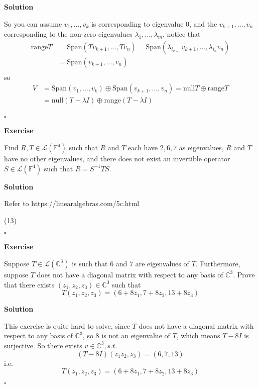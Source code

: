\documentclass{article}
\newenvironment{exercise}{%
{\textbf{Exercise\\}
    }
}{
}
\newenvironment{solution}{%
{
    \textbf{Solution\\}
    }
}{
  \hfill $\square$ 
  \par\bigskip 
}
\newcommand{\CC}{\mathbb{C}}
\newcommand{\FF}{\mathbb{F}}
\newcommand{\spans}{\text{Span}}
\newcommand{\range}{\text{range}}
\newcommand{\n}{\text{null}}
\begin{document}
\begin{CJK}{UTF8}{gkai}
\begin{solution}
    So you can assume $v_1,\ldots,v_k$ is corresponding to eigenvalue $0$, and the $v_{k+1},\ldots,v_n$ corresponding to the non-zero eigenvalues $\lambda_1,\ldots,\lambda_m$, notice that
    \[
    \begin{aligned}
        \range T &= \spans(Tv_{k+1},\ldots,Tv_n) =\spans( \lambda_{i_{k + 1}} v_{k+1},\ldots,\lambda_{i_{n}} v_n )\\
        &= \spans(v_{k+1},\ldots,v_n)\\
    \end{aligned}    
    \]
    so
    \[
    \begin{aligned}
    V &= \spans(v_1,\ldots,v_k) \oplus \spans(v_{k + 1},\ldots,v_n) = \n T \oplus \range T\\
    &= \n(T - \lambda I) \oplus \range (T - \lambda I)  \\
    \end{aligned}  
    \]
\end{solution}

\begin{exercise}
    Find $R ,T \in \mathcal{L}(\FF^4)$ such that $R$ and $T$ each have $2, 6, 7$ as eigenvalues, $R$ and $T$ have no other eigenvalues, and there does not exist an invertible operator $S \in\mathcal{L}(\FF^4)$ such that $R = S^{-1}TS$.
   
\end{exercise}

\begin{solution}
    Refer to https://linearalgebras.com/5c.html 
    
    (13)
\end{solution}

\begin{exercise}
    Suppose $T \in \mathcal{L}(\CC^3)$ is such that $6$ and $7$ are eigenvalues of $T$. Furthermore, suppose $T$ does not have a diagonal matrix with respect to any basis of $\CC^3$. Prove that there exists $(z_1,z_2,z_3) \in \CC^3$ such that
    \[T(z_1,z_2,z_3) = (6 + 8z_1,7 + 8z_2,13 + 8z_3)\]
\end{exercise}

\begin{solution}
    This exercise is quite hard to solve, since $T$ does not have a diagonal matrix with respect to any basis of $\CC^3$, so $8$ is not an eigenvalue of $T$, which means $T - 8 I$ is surjective. So there exists $v \in \CC^3, s.t.$
    \[(T - 8I)(z_1z_2,z_3) = (6,7,13)\]
    i.e.
    \[T(z_1,z_2,z_3) = (6 + 8z_1,7 + 8z_2,13 + 8z_3)\]
\end{solution}


\end{CJK}
\end{document}
